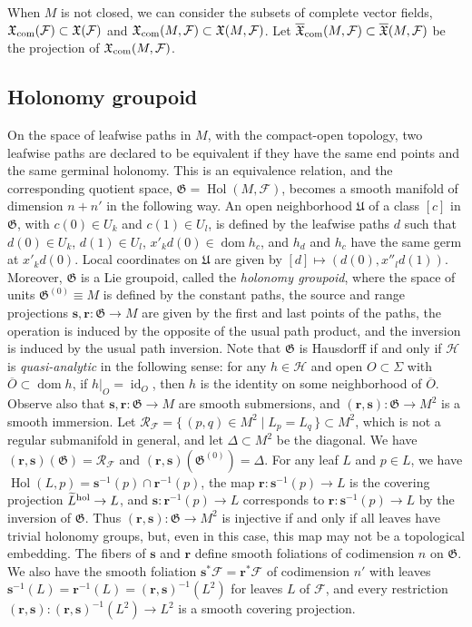 \documentclass{memo-l}
\theoremstyle{plain}
\theoremstyle{definition}
\theoremstyle{remark}
\newcommand{\FF}{\mathcal{F}}
\newcommand{\HH}{\mathcal{H}}
\newcommand{\RR}{\mathcal{R}}
\newcommand{\fG}{\mathfrak{G}}
\newcommand{\fU}{\mathfrak{U}}
\newcommand{\fX}{\mathfrak{X}}
\newcommand{\bfr}{\boldsymbol{r}}
\newcommand{\bfs}{\boldsymbol{s}}
\newcommand{\id}{\operatorname{id}}
\newcommand{\Hol}{\operatorname{Hol}}
\newcommand{\dom}{\operatorname{dom}}
\newcommand{\olfX}{\overline{\fX}}
\newcommand{\fXcom}{\fX_{\text{\rm com}}}
\newcommand{\fXb}{\fX_{\text{\rm b}}}
\newcommand{\olfXcom}{\overline{\fX}_{\text{\rm com}}}
\numberwithin{section}{chapter}
\numberwithin{equation}{section}%
\begin{document}
When $M$ is not closed, we can consider the subsets of complete vector fields, $\fXcom(\FF)\subset\fX(\FF)$ and $\fXcom(M,\FF)\subset\fX(M,\FF)$. Let $\olfXcom(M,\FF)\subset\olfX(M,\FF)$ be the projection of $\fXcom(M,\FF)$. 




\subsection{Holonomy groupoid}\label{ss: holonomy groupoid}

On the space of leafwise paths in $M$, with the compact-open topology, two leafwise paths are declared to be equivalent if they have the same end points and the same germinal holonomy. This is an equivalence relation, and the corresponding quotient space, $\fG=\Hol(M,\FF)$, becomes a smooth manifold of dimension $n+n'$ in the following way. An open neighborhood $\fU$ of a class $[c]$ in $\fG$, with $c(0)\in U_k$ and $c(1)\in U_l$, is defined by the leafwise paths $d$ such that $d(0)\in U_k$, $d(1)\in U_l$, $x'_kd(0)\in\dom h_c$, and $h_d$ and $h_c$ have the same germ at $x'_kd(0)$. Local coordinates on $\fU$ are given by $[d]\mapsto(d(0),x''_ld(1))$. Moreover, $\fG$ \index{$\fG$} is a Lie groupoid, called the \emph{holonomy groupoid},  where the space of units $\fG^{(0)}\equiv M$ is defined by the constant paths, the source and range projections $\bfs,\bfr:\fG\to M$ are given by the first and last points of the paths, the operation is induced by the opposite of the usual path product, and the inversion is induced by the usual path inversion. Note that $\fG$ is Hausdorff if and only if $\HH$ is \emph{quasi-analytic} in the following sense: for any $h\in\HH$ and open $O\subset\Sigma$ with $\overline O\subset\dom h$, if $h|_O=\id_O$, then $h$ is the identity on some neighborhood of $\overline O$. Observe also that $\bfs,\bfr:\fG\to M$ are smooth submersions, and $(\bfr,\bfs):\fG\to M^2$ is a smooth immersion. Let $\RR_\FF=\{\,(p,q)\in M^2\mid L_p=L_q\,\}\subset M^2$, which is not a regular submanifold in general, and let $\Delta\subset M^2$ be the diagonal. We have $(\bfr,\bfs)(\fG)=\RR_\FF$ and $(\bfr,\bfs)(\fG^{(0)})=\Delta$. For any leaf $L$ and $p\in L$, we have $\Hol(L,p)=\bfs^{-1}(p)\cap\bfr^{-1}(p)$, the map $\bfr:\bfs^{-1}(p)\to L$ is the covering projection $\widetilde L^{\text{\rm hol}}\to L$, and $\bfs:\bfr^{-1}(p)\to L$ corresponds to $\bfr:\bfs^{-1}(p)\to L$ by the inversion of $\fG$. Thus $(\bfr,\bfs):\fG\to M^2$ is injective if and only if all leaves have trivial holonomy groups, but, even in this case, this map may not be a topological embedding. The fibers of $\bfs$ and $\bfr$ define smooth foliations of codimension $n$ on $\fG$. We also have the smooth foliation $\bfs^*\FF=\bfr^*\FF$ of codimension $n'$ with leaves $\bfs^{-1}(L)=\bfr^{-1}(L)=(\bfr,\bfs)^{-1}(L^2)$ for leaves $L$ of $\FF$, and every restriction $(\bfr,\bfs):(\bfr,\bfs)^{-1}(L^2)\to L^2$ is a smooth covering projection.
\end{document}
